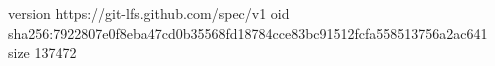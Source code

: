 version https://git-lfs.github.com/spec/v1
oid sha256:7922807e0f8eba47cd0b35568fd18784cce83bc91512fcfa558513756a2ac641
size 137472
